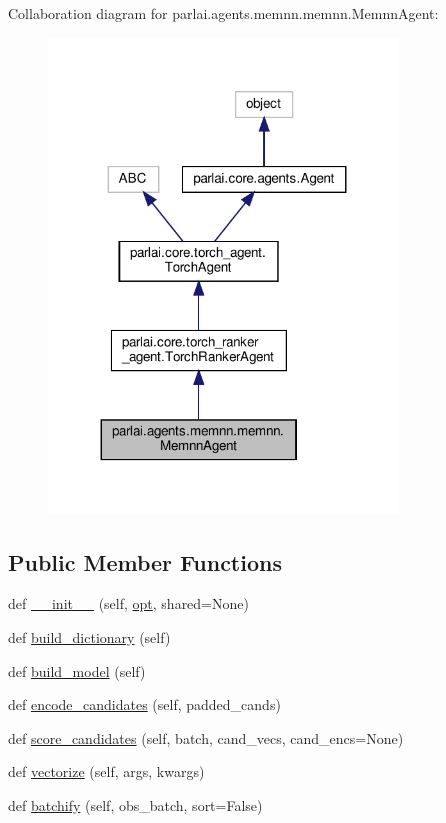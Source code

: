 Collaboration diagram for parlai.\+agents.\+memnn.\+memnn.\+Memnn\+Agent\+:
\nopagebreak
\begin{figure}[H]
\begin{center}
\leavevmode
\includegraphics[width=263pt]{dc/daf/classparlai_1_1agents_1_1memnn_1_1memnn_1_1MemnnAgent__coll__graph}
\end{center}
\end{figure}
\subsection*{Public Member Functions}
\begin{DoxyCompactItemize}
\item 
def \hyperlink{classparlai_1_1agents_1_1memnn_1_1memnn_1_1MemnnAgent_a256f911504285d19b006def388d0772f}{\+\_\+\+\_\+init\+\_\+\+\_\+} (self, \hyperlink{classparlai_1_1core_1_1torch__agent_1_1TorchAgent_a785bb920cf8c8afc3e9bf6a8b77e335a}{opt}, shared=None)
\item 
def \hyperlink{classparlai_1_1agents_1_1memnn_1_1memnn_1_1MemnnAgent_af314871636896b61139ef761765a1872}{build\+\_\+dictionary} (self)
\item 
def \hyperlink{classparlai_1_1agents_1_1memnn_1_1memnn_1_1MemnnAgent_aa5b5782548443a008c0502ec9ddedee2}{build\+\_\+model} (self)
\item 
def \hyperlink{classparlai_1_1agents_1_1memnn_1_1memnn_1_1MemnnAgent_ab0c47ca129aeec437446202c941e0a56}{encode\+\_\+candidates} (self, padded\+\_\+cands)
\item 
def \hyperlink{classparlai_1_1agents_1_1memnn_1_1memnn_1_1MemnnAgent_a10b5418eda4da7bc85913e24e5b5a029}{score\+\_\+candidates} (self, batch, cand\+\_\+vecs, cand\+\_\+encs=None)
\item 
def \hyperlink{classparlai_1_1agents_1_1memnn_1_1memnn_1_1MemnnAgent_a4c2d3c0bb7d0b78b1c6aa91eca8dd24e}{vectorize} (self, args, kwargs)
\item 
def \hyperlink{classparlai_1_1agents_1_1memnn_1_1memnn_1_1MemnnAgent_a463b88b1d7fc9a7adea9802762c5968c}{batchify} (self, obs\+\_\+batch, sort=False)
\end{DoxyCompactItemize}

